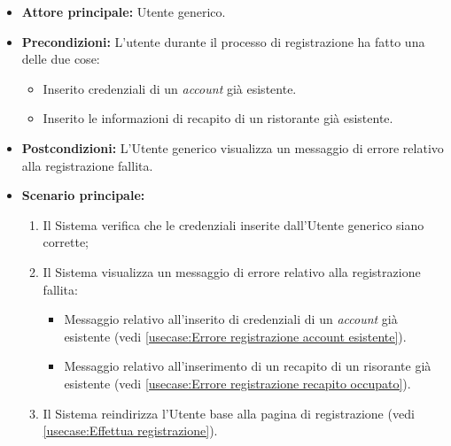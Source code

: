 \label{usecase:Registrazione fallita}

\begin{itemize}
	\item \textbf{Attore principale:} Utente generico.
	\item \textbf{Precondizioni:}
    L'utente durante il processo di registrazione ha fatto una delle due cose:
    \begin{itemize}
        \item Inserito credenziali di un \textit{account} già esistente.
        \item Inserito le informazioni di recapito di un ristorante già esistente.
    \end{itemize}
	\item \textbf{Postcondizioni:} L'Utente generico visualizza un messaggio di errore relativo alla registrazione fallita.

	\item \textbf{Scenario principale:}
	\begin{enumerate}
        \item Il Sistema verifica che le credenziali inserite dall'Utente generico siano corrette;
        \item Il Sistema visualizza un messaggio di errore relativo alla registrazione fallita:
            \begin{itemize}
                \item Messaggio relativo all'inserito di credenziali di un \textit{account} già esistente (vedi \autoref{usecase:Errore registrazione account esistente}).
                \item Messaggio relativo all'inserimento di un recapito di un risorante già esistente (vedi \autoref{usecase:Errore registrazione recapito occupato}).
            \end{itemize}
        \item Il Sistema reindirizza l'Utente base alla pagina di registrazione (vedi \autoref{usecase:Effettua registrazione}).
    \end{enumerate}
	
\end{itemize}


